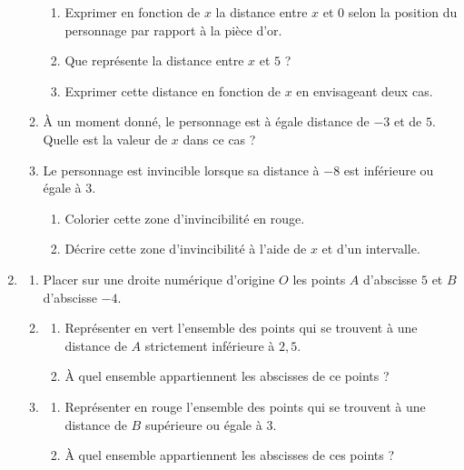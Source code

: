 \documentclass[a4paper,dvipsnames]{article}
\begin{document}
\begin{enumerate}
\begin{enumerate}
	\begin{enumerate}
	  \item Exprimer en fonction de $x$ la distance entre $x$ et $0$ selon la position du personnage par rapport à la pièce d'or.
	  \item Que représente la distance entre $x$ et $5$ ?
	  \item Exprimer cette distance en fonction de $x$ en envisageant deux cas.
	\end{enumerate}
      \item À un moment donné, le personnage est à égale distance de $-3$ et de $5$. Quelle est la valeur de $x$ dans ce cas ?
      \item Le personnage est invincible lorsque sa distance à $-8$ est inférieure ou égale à $3$.
	\begin{enumerate}
	  \item Colorier cette zone d'invincibilité en rouge.
	  \item Décrire cette zone d'invincibilité à l'aide de $x$ et d'un intervalle.
	\end{enumerate}
    \end{enumerate}
  \item 
    \begin{enumerate}
      \item Placer sur une droite numérique d'origine $O$ les points $A$ d'abscisse $5$ et $B$ d'abscisse $-4$.
      \item 
	\begin{enumerate}
	  \item Représenter en vert l'ensemble des points qui se trouvent à une distance de $A$ strictement inférieure à $2,5$.
	  \item À quel ensemble appartiennent les abscisses de ce points ?
	\end{enumerate}
      \item 
	\begin{enumerate}
	  \item Représenter en rouge l'ensemble des points qui se trouvent à une distance de $B$ supérieure ou égale à $3$.
	  \item À quel ensemble appartiennent les abscisses de ces points ?
	\end{enumerate}
    \end{enumerate}
\end{enumerate}
\end{document}

